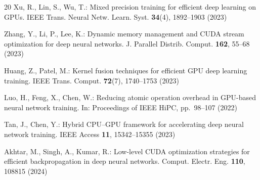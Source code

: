 \documentclass[runningheads]{llncs}
\begin{document}
\begin{thebibliography}{20}
Xu, R., Lin, S., Wu, T.: Mixed precision training for efficient deep
learning on GPUs. IEEE Trans. Neural Netw. Learn. Syst. \textbf{34}(4),
1892--1903 (2023)

Zhang, Y., Li, P., Lee, K.: Dynamic memory management and CUDA stream
optimization for deep neural networks. J. Parallel Distrib. Comput.
\textbf{162}, 55--68 (2023)

Huang, Z., Patel, M.: Kernel fusion techniques for efficient GPU deep
learning training. IEEE Trans. Comput. \textbf{72}(7), 1740--1753 (2023)

Luo, H., Feng, X., Chen, W.: Reducing atomic operation overhead in
GPU-based neural network training. In: Proceedings of IEEE HiPC,
pp.~98--107 (2022)

Tan, J., Chen, Y.: Hybrid CPU--GPU framework for accelerating deep neural
network training. IEEE Access \textbf{11}, 15342--15355 (2023)

Akhtar, M., Singh, A., Kumar, R.: Low-level CUDA optimization strategies
for efficient backpropagation in deep neural networks. Comput. Electr.
Eng. \textbf{110}, 108815 (2024)

\end{thebibliography}
\end{document}
